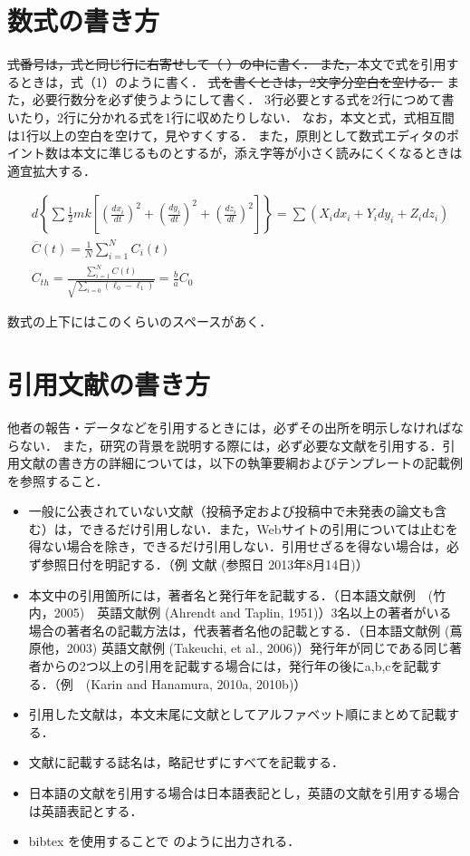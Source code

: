 \documentclass[year=2026]{sit}
\begin{document}
\section{数式の書き方}\label{sec:equations}
\sout{式番号は，式と同じ行に右寄せして（ ）の中に書く．
また，}本文で式を引用するときは，式（1）のように書く．
\sout{式を書くときは，2文字分空白を空ける．}
また，必要行数分を必ず使うようにして書く．
3行必要とする式を2行につめて書いたり，2行に分かれる式を1行に収めたりしない．
なお，本文と式，式相互間は1行以上の空白を空けて，見やすくする．
また，原則として数式エディタのポイント数は本文に準じるものとするが，添え字等が小さく読みにくくなるときは適宜拡大する．

\begin{align}
  & d\left\{\sum \frac{1}{2}mk\left[%
    \left(\frac{dx_i}{dt}\right)^2%
    + \left(\frac{dy_i}{dt}\right)^2%
    + \left(\frac{dz_i}{dt}\right)^2%
  \right]\right\} = \sum\left(X_i dx_i + Y_i dy_i + Z_i dz_i\right)\\
  & \overline{C}(t) = \frac{1}{N}\sum_{i=1}^{N} C_i(t)\\
  & C_\mathit{th} = \frac{\displaystyle\sum_{i=1}^N C(t)}{\sqrt{\displaystyle\sum_{i=0} (\ell_0 - \ell_1)}} = \frac{b}{a}C_0
\end{align}

数式の上下にはこのくらいのスペースがあく．


\section{引用文献の書き方}\label{sec:citation}

他者の報告・データなどを引用するときには，必ずその出所を明示しなければならない．
また，研究の背景を説明する際には，必ず必要な文献を引用する．引用文献の書き方の詳細については，以下の執筆要綱およびテンプレートの記載例を参照すること．

\begin{itemize}
  \item[（1）] 一般に公表されていない文献（投稿予定および投稿中で未発表の論文も含む）は，できるだけ引用しない．また，Webサイトの引用については止むを得ない場合を除き，できるだけ引用しない．引用せざるを得ない場合は，必ず参照日付を明記する．（例  文献 (参照日 2013年8月14日)）
  \item[（2）] 本文中の引用箇所には，著者名と発行年を記載する．（日本語文献例　(竹内，2005)　英語文献例 (Ahrendt and Taplin, 1951)）3名以上の著者がいる場合の著者名の記載方法は，代表著者名他の記載とする．（日本語文献例 (蔦原他，2003)  英語文献例 (Takeuchi, et al., 2006)）発行年が同じである同じ著者からの2つ以上の引用を記載する場合には，発行年の後にa,b,cを記載する．（例　(Karin and Hanamura, 2010a, 2010b)）
  \item[（3）] 引用した文献は，本文末尾に文献としてアルファベット順にまとめて記載する．
  \item[（4）] 文献に記載する誌名は，略記せずにすべてを記載する．
  \item[（5）] 日本語の文献を引用する場合は日本語表記とし，英語の文献を引用する場合は英語表記とする．
  \item[（6）] bibtex を使用することで \cite{shinjuku:1987,keer:1986} のように出力される．
\end{itemize}
\end{document}
